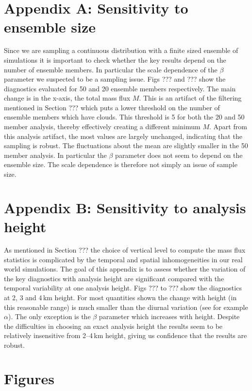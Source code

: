 \documentclass[a4paper, 12pt]{article}
\begin{document}
\section{Appendix A: Sensitivity to ensemble size}
Since we are sampling a continuous distribution with a finite sized ensemble of simulations it is important to check whether the key results depend on the number of ensemble members. In particular the scale dependence of the $\beta$ parameter we suspected to be a sampling issue. Figs ??? and ??? show the diagnostics evaluated for 50 and 20 ensemble members respectively. The main change is in the x-axis, the total mass flux $M$. This is an artifact of the filtering mentioned in Section ??? which puts a lower threshold on the number of ensemble members which have clouds. This threshold is 5 for both the 20 and 50 member analysis, thereby effectively creating a different minimum $M$. Apart from this analysis artifact, the most values are largely unchanged, indicating that the sampling is robust. The fluctuations about the mean are slightly smaller in the 50 member analysis. In particular the $\beta$ parameter does not seem to depend on the ensemble size. The scale dependence is therefore not simply an issue of sample size. 

\section{Appendix B: Sensitivity to analysis height}
As mentioned in Section ??? the choice of vertical level to compute the mass flux statistics is complicated by the temporal and spatial inhomogeneities in our real world simulations. The goal of this appendix is to assess whether the variation of the key diagnostics with analysis height are significant compared with the temporal variability at one analysis height. Figs ??? to ??? show the diagnostics at 2, 3 and 4\,km height. For most quantities shown the change with height (in this reasonable range) is much smaller than the diurnal variation (see for example $\alpha$). The only exception is the $\beta$ parameter which increases with height. Despite the difficulties in choosing an exact analysis height the results seem to be relatively insensitive from 2--4\,km height, giving us confidence that the results are robust. 



\newpage

{\small
 }

\newpage
\section{Figures}
\end{document}
